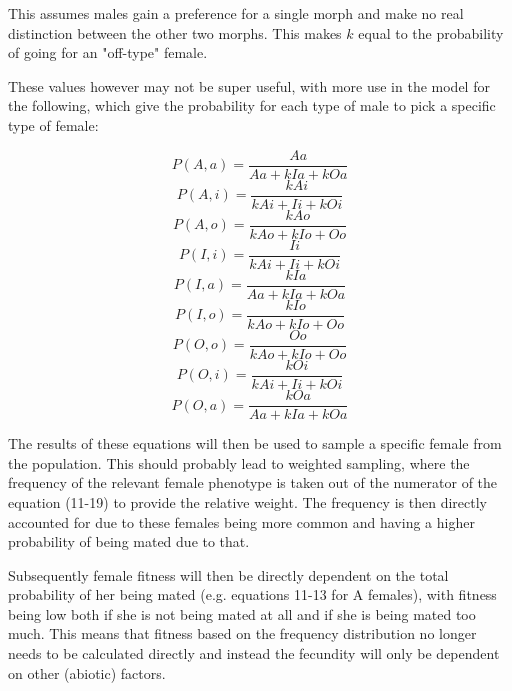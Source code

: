 \documentclass{article}
\begin{document}
\noindent This assumes males gain a preference for a single morph and make no real distinction between the other two morphs. This makes \(k\) equal to the probability of going for an "off-type" female.

\noindent These values however may not be super useful, with more use in the model for the following, which give the probability for each type of male to pick a specific type of female:

\begin{equation}P(A,a) = \frac{Aa}{Aa+kIa+kOa} \end{equation}
\begin{equation}P(A,i) = \frac{kAi}{kAi+Ii+kOi} \end{equation}
\begin{equation}P(A,o) = \frac{kAo}{kAo+kIo+Oo} \end{equation}
\begin{equation}P(I,i) = \frac{Ii}{kAi+Ii+kOi} \end{equation}
\begin{equation}P(I,a) = \frac{kIa}{Aa+kIa+kOa} \end{equation}
\begin{equation}P(I,o) = \frac{kIo}{kAo+kIo+Oo} \end{equation}
\begin{equation}P(O,o) = \frac{Oo}{kAo+kIo+Oo} \end{equation}
\begin{equation}P(O,i) = \frac{kOi}{kAi+Ii+kOi} \end{equation}
\begin{equation}P(O,a) = \frac{kOa}{Aa+kIa+kOa} \end{equation}

The results of these equations will then be used to sample a specific female from the population. This should probably lead to weighted sampling, where the frequency of the relevant female phenotype is taken out of the numerator of the equation (11-19) to provide the relative weight. The frequency is then directly accounted for due to these females being more common and having a higher probability of being mated due to that.

\noindent Subsequently female fitness will then be directly dependent on the total probability of her being mated (e.g. equations 11-13 for A females), with fitness being low both if she is not being mated at all and if she is being mated too much. This means that fitness based on the frequency distribution no longer needs to be calculated directly and instead the fecundity will only be dependent on other (abiotic) factors.
\end{document}
